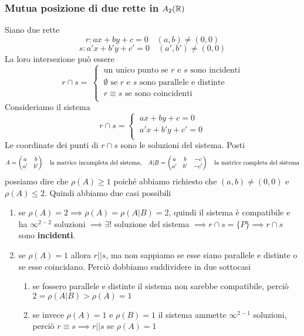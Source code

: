 \subsubsection{Mutua posizione di due rette in \(A_2(\RR )\)}
Siano due rette \[
r: ax + by + c = 0 \quad (a,b) \neq (0,0)
\] \[
s: a'x + b'y + c' = 0 \quad (a', b') \neq (0,0)
\]
La loro intersezione può essere \[ r \cap s = \
\begin{cases}
    \ \text{un unico punto se \(r\) e \(s\) sono incidenti} \\
    \ \emptyset \text{ se \(r\) e \(s\) sono parallele e distinte} \\
    \ r \equiv s \text{ se sono coincidenti } \\
\end{cases}
\]
Consideriamo il sistema \[r \cap s=
\begin{cases}
    \ ax + by + c = 0 \\
    \ a'x + b'y + c' = 0 \\
\end{cases}
\]
Le coordinate dei punti di \(r \cap s\) sono le soluzioni del sistema. Posti \[
A =
\left( \; \\
 \begin{matrix}
    a & b \\
    a' & b' \\
\end{matrix} \; \\
 \right) \quad \text{la matrice incompleta del sistema,}
 \quad A|B =
\left( \; \\
 \begin{matrix}
    a & b & -c \\
    a' & b' & -c' \\
\end{matrix} \; \\
 \right) \quad \text{la matrice completa del sistema}
\] possiamo dire che \(\rho(A) \ge 1\) poiché abbiamo richiesto che \((a,b) \neq (0,0)\) e \(\rho(A) \le 2\). Quindi abbiamo due casi possibili
\begin{enumerate}
    \item se \(\rho(A) = 2 \implies \rho(A) = \rho(A|B) =2\), quindi il sistema è compatibile e ha \(\infty^{2-2}\) soluzioni \(\implies \exists !\) soluzione del sistema \(\implies r \cap s = \{P\} \implies r \cap s\) sono \textbf{incidenti}.
    \item se \(\rho(A) = 1\) allora \(r || s\), ma non sappiamo se esse siano parallele e distinte o se esse coincidano. Perciò dobbiamo suddividere in due sottocasi
        \begin{enumerate}
            \item se fossero parallele e distinte il sistema non sarebbe compatibile, perciò \(2= \rho(A|B) > \rho(A) = 1\)
            \item se invece \(\rho(A) = 1\) e \(\rho(B) = 1\) il sistema ammette \(\infty^{2-1}\) soluzioni, perciò \(r \equiv s \implies r||s\) se \(\rho(A) = 1\)
        \end{enumerate}
\end{enumerate}

